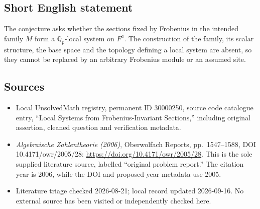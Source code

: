 \documentclass[11pt]{article}
\newcommand{\Q}{\mathbb{Q}}
\begin{document}
\subsection{Short English statement}
The conjecture asks whether the sections fixed by Frobenius in the intended family \(M\) form a \(\Q_p\)-local system on \(F^a\). The construction of the family, its scalar structure, the base space and the topology defining a local system are absent, so they cannot be replaced by an arbitrary Frobenius module or an assumed site.
\subsection{Sources}
\begin{itemize}
\item Local UnsolvedMath registry, permanent ID 30000250, source code catalogue entry, ``Local Systems from Frobenius-Invariant Sections,'' including original assertion, cleaned question and verification metadata.
\item \emph{Algebraische Zahlentheorie (2006)}, Oberwolfach Reports, pp.\ 1547--1588, DOI 10.4171/owr/2005/28: \url{https://doi.org/10.4171/owr/2005/28}. This is the sole supplied literature source, labelled ``original problem report.'' The citation year is 2006, while the DOI and proposed-year metadata use 2005.
\item Literature triage checked 2026-08-21; local record updated 2026-09-16. No external source has been visited or independently checked here.
\end{itemize}
\end{document}
